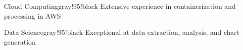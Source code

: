 \documentclass[letterpaper,11pt]{article}
\begin{document}
\begin{minipage}[top][3.25in][]{3in}
    \vspace{-0in}
	\begin{mybox}{Cloud Computing}{}{gray!95!black}
		Extensive experience in containerization and processing in AWS
	\end{mybox}
	\begin{mybox}{Data Science}{}{gray!95!black}
		Exceptional at data extraction, analysis, and chart generation
	\end{mybox}

\end{minipage}
\end{document}
